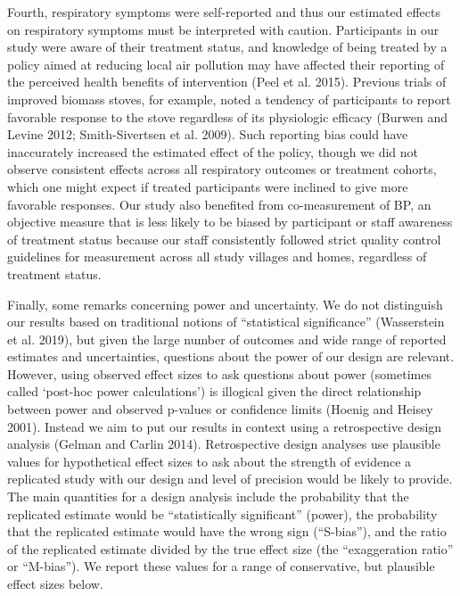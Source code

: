 \documentclass[
  letterpaper,
  DIV=11,
  numbers=noendperiod]{scrartcl}
\begin{document}
Fourth, respiratory symptoms were self-reported and thus our estimated
effects on respiratory symptoms must be interpreted with caution.
Participants in our study were aware of their treatment status, and
knowledge of being treated by a policy aimed at reducing local air
pollution may have affected their reporting of the perceived health
benefits of intervention (Peel et al. 2015). Previous trials of improved
biomass stoves, for example, noted a tendency of participants to report
favorable response to the stove regardless of its physiologic efficacy
(Burwen and Levine 2012; Smith-Sivertsen et al. 2009). Such reporting
bias could have inaccurately increased the estimated effect of the
policy, though we did not observe consistent effects across all
respiratory outcomes or treatment cohorts, which one might expect if
treated participants were inclined to give more favorable responses. Our
study also benefited from co-measurement of BP, an objective measure
that is less likely to be biased by participant or staff awareness of
treatment status because our staff consistently followed strict quality
control guidelines for measurement across all study villages and homes,
regardless of treatment status.

Finally,  some remarks concerning power and uncertainty.
We do not distinguish our results based on traditional notions of
``statistical significance'' (Wasserstein et al. 2019), but given the
large number of outcomes and wide range of reported estimates and
uncertainties, questions about the power of our design are relevant.
However, using observed effect sizes to ask questions about power
(sometimes called `post-hoc power calculations') is illogical given the
direct relationship between power and observed p-values or confidence
limits (Hoenig and Heisey 2001). Instead we aim to put our results in
context using a retrospective design analysis (Gelman and Carlin 2014).
Retrospective design analyses use plausible values for hypothetical
effect sizes to ask about the strength of evidence a replicated study
with our design and level of precision would be likely to provide. The
main quantities for a design analysis include the probability that the
replicated estimate would be ``statistically significant'' (power), the
probability that the replicated estimate would have the wrong sign
(``S-bias''), and the ratio of the replicated estimate divided by the
true effect size (the ``exaggeration ratio'' or ``M-bias''). We report
these values for a range of conservative, but plausible effect sizes
below.
\end{document}
